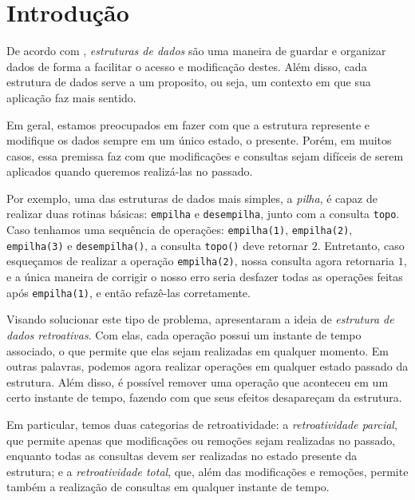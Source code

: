 
\chapter{Introdução}
\label{cap:introducao}

De acordo com \citet{10.5555/1614191}, \emph{estruturas de dados} são uma maneira de guardar e organizar dados de forma a facilitar o acesso e modificação destes. Além disso, cada estrutura de dados serve a um proposito, ou seja, um contexto em que sua aplicação faz mais sentido.

Em geral, estamos preocupados em fazer com que a estrutura represente e modifique os dados sempre em um único estado, o presente. Porém, em muitos casos, essa premissa faz com que modificações e consultas sejam difíceis de serem aplicados quando queremos realizá-las no passado.

Por exemplo, uma das estruturas de dados mais simples, a \emph{pilha}, é capaz de realizar duas rotinas básicas: \texttt{empilha} e \texttt{desempilha}, junto com a consulta \texttt{topo}. Caso tenhamos uma sequência de operações: \texttt{empilha(1)}, \texttt{empilha(2)}, \texttt{empilha(3)} e \texttt{desempilha()}, a consulta \texttt{topo()} deve retornar $2$. Entretanto, caso esqueçamos de realizar a operação \texttt{empilha(2)}, nossa consulta agora retornaria $1$, e a única maneira de corrigir o nosso erro seria desfazer todas as operações feitas após \texttt{empilha(1)}, e então refazê-las corretamente.

Visando solucionar este tipo de problema, \citet{10.1145/1240233.1240236} apresentaram a ideia de \emph{estrutura de dados retroativas}. Com elas, cada operação possui um instante de tempo associado, o que permite que elas sejam realizadas em qualquer momento. Em outras palavras, podemos agora realizar operações em qualquer estado passado da estrutura. Além disso, é possível remover uma operação que aconteceu em um certo instante de tempo, fazendo com que seus efeitos desapareçam da estrutura.

Em particular, temos duas categorias de retroatividade: a \emph{retroatividade parcial}, que permite apenas que modificações ou remoções sejam realizadas no passado, enquanto todas as consultas devem ser realizadas no estado presente da estrutura; e a \emph{retroatividade total}, que, além das modificações e remoções, permite também a realização de consultas em qualquer instante de tempo.

